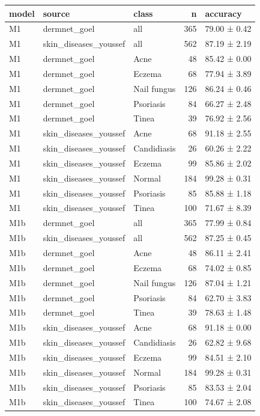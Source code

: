 \begin{tabular}{lllrl}
\toprule
model & source & class & n & accuracy \\
\midrule
M1 & dermnet\_goel & all & 365 & 79.00 ± 0.42 \\
M1 & skin\_diseases\_youssef & all & 562 & 87.19 ± 2.19 \\
M1 & dermnet\_goel & Acne & 48 & 85.42 ± 0.00 \\
M1 & dermnet\_goel & Eczema & 68 & 77.94 ± 3.89 \\
M1 & dermnet\_goel & Nail fungus & 126 & 86.24 ± 0.46 \\
M1 & dermnet\_goel & Psoriasis & 84 & 66.27 ± 2.48 \\
M1 & dermnet\_goel & Tinea & 39 & 76.92 ± 2.56 \\
M1 & skin\_diseases\_youssef & Acne & 68 & 91.18 ± 2.55 \\
M1 & skin\_diseases\_youssef & Candidiasis & 26 & 60.26 ± 2.22 \\
M1 & skin\_diseases\_youssef & Eczema & 99 & 85.86 ± 2.02 \\
M1 & skin\_diseases\_youssef & Normal & 184 & 99.28 ± 0.31 \\
M1 & skin\_diseases\_youssef & Psoriasis & 85 & 85.88 ± 1.18 \\
M1 & skin\_diseases\_youssef & Tinea & 100 & 71.67 ± 8.39 \\
M1b & dermnet\_goel & all & 365 & 77.99 ± 0.84 \\
M1b & skin\_diseases\_youssef & all & 562 & 87.25 ± 0.45 \\
M1b & dermnet\_goel & Acne & 48 & 86.11 ± 2.41 \\
M1b & dermnet\_goel & Eczema & 68 & 74.02 ± 0.85 \\
M1b & dermnet\_goel & Nail fungus & 126 & 87.04 ± 1.21 \\
M1b & dermnet\_goel & Psoriasis & 84 & 62.70 ± 3.83 \\
M1b & dermnet\_goel & Tinea & 39 & 78.63 ± 1.48 \\
M1b & skin\_diseases\_youssef & Acne & 68 & 91.18 ± 0.00 \\
M1b & skin\_diseases\_youssef & Candidiasis & 26 & 62.82 ± 9.68 \\
M1b & skin\_diseases\_youssef & Eczema & 99 & 84.51 ± 2.10 \\
M1b & skin\_diseases\_youssef & Normal & 184 & 99.28 ± 0.31 \\
M1b & skin\_diseases\_youssef & Psoriasis & 85 & 83.53 ± 2.04 \\
M1b & skin\_diseases\_youssef & Tinea & 100 & 74.67 ± 2.08 \\

\end{tabular}
